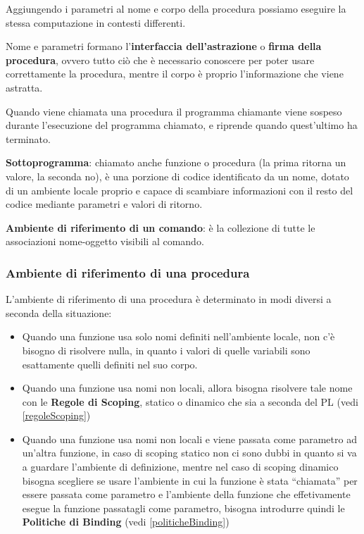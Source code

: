 \documentclass[12pt,a4paper]{article}
\begin{document}
Aggiungendo i parametri al nome e corpo della procedura possiamo eseguire la stessa computazione in contesti differenti.

Nome e parametri formano l'\textbf{interfaccia dell'astrazione} o \textbf{firma della procedura}, ovvero tutto ciò che è necessario conoscere per poter usare correttamente la procedura, mentre il
corpo è proprio l'informazione che viene astratta.

Quando viene chiamata una procedura il programma chiamante viene sospeso durante l'esecuzione del programma chiamato, e riprende quando quest'ultimo ha terminato.

\textbf{Sottoprogramma}: chiamato anche funzione o procedura (la prima ritorna un valore, la seconda no), è una porzione di
codice identificato da un nome, dotato di un ambiente locale proprio e capace di scambiare informazioni con il resto del codice mediante parametri e valori di ritorno.

\textbf{Ambiente di riferimento di un comando}: è la collezione di tutte le associazioni nome-oggetto visibili al comando.

\subsubsection{Ambiente di riferimento di una procedura}
L'ambiente di riferimento di una procedura è determinato in modi diversi a seconda della situazione:

\begin{itemize}
\item Quando una funzione usa solo nomi definiti nell'ambiente locale, non c'è bisogno di risolvere nulla, in quanto i valori di quelle variabili sono esattamente quelli definiti nel suo corpo.

\item Quando una funzione usa nomi non locali, allora bisogna risolvere tale nome con le \textbf{Regole di Scoping}, statico o dinamico che sia a seconda del PL (vedi \ref{regoleScoping})

\item Quando una funzione usa nomi non locali e viene passata come parametro ad un'altra funzione, in caso di scoping statico non ci sono dubbi in quanto si va a guardare l'ambiente di definizione, mentre nel caso di scoping dinamico bisogna scegliere se usare l'ambiente in cui la funzione è stata ``chiamata'' per essere passata come parametro e l'ambiente della funzione che effetivamente esegue la funzione passatagli come parametro, bisogna introdurre quindi le \textbf{Politiche di Binding} (vedi \ref{politicheBinding})
\end{itemize}
\end{document}
